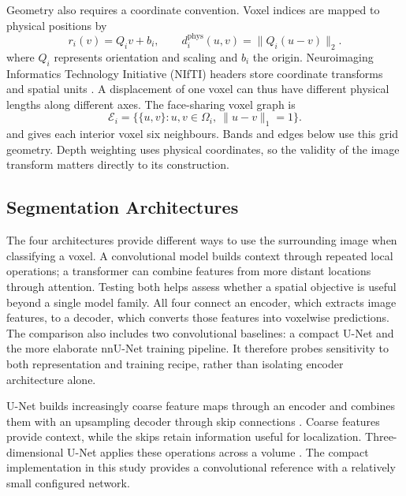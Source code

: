 \documentclass[12pt,a4paper]{article}
\begin{document}
Geometry also requires a coordinate convention. Voxel indices are mapped
to physical positions by
\begin{equation}
r_i(v)=Q_i v+b_i,
\qquad
d_i^{\mathrm{phys}}(u,v)=\lVert Q_i(u-v)\rVert_2.
\label{eq:physical-coordinates}
\end{equation}
where $Q_i$ represents orientation and scaling and $b_i$ the origin.
Neuroimaging Informatics Technology Initiative (NIfTI) headers store
coordinate transforms and spatial units
\cite{nifti1fields}. A displacement of one voxel can thus have different
physical lengths along different axes. The face-sharing voxel graph is
\begin{equation}
\mathcal{E}_i=\{\{u,v\}:u,v\in\Omega_i,\ \lVert u-v\rVert_1=1\}.
\label{eq:voxel-neighbourhood}
\end{equation}
and gives each interior voxel six neighbours. Bands and edges below use
this grid geometry. Depth weighting uses physical coordinates, so the
validity of the image transform matters directly to its construction.

\subsection{Segmentation Architectures}\label{sec:segmentation-architectures}

The four architectures provide different ways to use the surrounding
image when classifying a voxel. A convolutional model builds context
through repeated local operations; a transformer can combine features
from more distant locations through attention. Testing both helps assess
whether a spatial objective is useful beyond a single model family.
All four connect an encoder, which extracts image features, to a decoder,
which converts those features into voxelwise predictions. The comparison
also includes two convolutional baselines: a compact U-Net and the more
elaborate nnU-Net training pipeline. It therefore probes sensitivity to
both representation and training recipe, rather than isolating encoder
architecture alone.

U-Net builds increasingly coarse feature maps through an encoder and
combines them with an upsampling decoder through skip connections
\cite{ronneberger2015unet}. Coarse features provide context, while the
skips retain information useful for localization. Three-dimensional
U-Net applies these operations across a volume \cite{cicek2016unet}.
The compact implementation in this study provides a convolutional
reference with a relatively small configured network.
\end{document}
